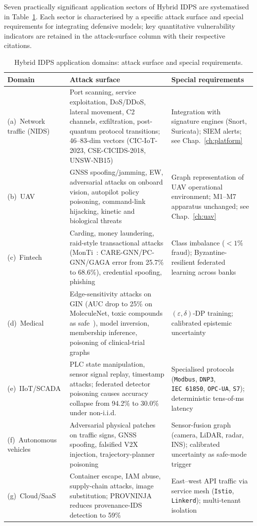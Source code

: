 Seven practically significant application sectors of Hybrid IDPS are systematised in Table~\ref{tab:idps_sectors}. Each sector is characterised by a specific attack surface and special requirements for integrating defensive models; key quantitative vulnerability indicators are retained in the attack-surface column with their respective citations.

\begin{table}[htbp]
\centering
\caption{Hybrid IDPS application domains: attack surface and special requirements.}
\label{tab:idps_sectors}
\small
\setlength{\tabcolsep}{4pt}
\begin{tabular}{p{2.8cm} p{6.5cm} p{5.0cm}}
\toprule
\textbf{Domain} & \textbf{Attack surface} & \textbf{Special requirements} \\
\midrule
(a)~Network traffic (NIDS) & Port scanning, service exploitation, DoS/DDoS, lateral movement, C2 channels, exfiltration, post-quantum protocol transitions; 46--83-dim vectors (CIC-IoT-2023, CSE-CICIDS-2018, UNSW-NB15) & Integration with signature engines (Snort, Suricata); SIEM alerts; see Chap.~\ref{ch:platform} \\
\addlinespace
(b)~UAV & GNSS spoofing/jamming, EW, adversarial attacks on onboard vision, autopilot policy poisoning, command-link hijacking, kinetic and biological threats & Graph representation of UAV operational environment; M1--M7 apparatus unchanged; see Chap.~\ref{ch:uav} \\
\addlinespace
(c)~Fintech & Carding, money laundering, raid-style transactional attacks (MonTi~\cite{MonTi2025}: CARE-GNN/PC-GNN/GAGA error from 25.7\% to 68.6\%), credential spoofing, phishing & Class imbalance ($<\!1\%$ fraud); Byzantine-resilient federated learning across banks \\
\addlinespace
(d)~Medical & Edge-sensitivity attacks on GIN (AUC drop to 25\% on MoleculeNet, toxic compounds as safe~\cite{EdgeSensitivity2025}), model inversion, membership inference, poisoning of clinical-trial graphs & $(\varepsilon,\delta)$-DP training; calibrated epistemic uncertainty \\
\addlinespace
(e)~IIoT/SCADA & PLC state manipulation, sensor signal replay, timestamp attacks; federated detector poisoning causes accuracy collapse from 94.2\% to 30.0\% under non-i.i.d.~\cite{FerragPoisoning2023} & Specialised protocols (\texttt{Modbus}, \texttt{DNP3}, \texttt{IEC~61850}, \texttt{OPC-UA}, \texttt{S7}); deterministic tens-of-ms latency \\
\addlinespace
(f)~Autonomous vehicles & Adversarial physical patches on traffic signs, GNSS spoofing, falsified V2X injection, trajectory-planner poisoning & Sensor-fusion graph (camera, LiDAR, radar, INS); calibrated uncertainty as safe-mode trigger \\
\addlinespace
(g)~Cloud/SaaS & Container escape, IAM abuse, supply-chain attacks, image substitution; PROVNINJA~\cite{PROVNINJA2023} reduces provenance-IDS detection to 59\% & East--west API traffic via service mesh (\texttt{Istio}, \texttt{Linkerd}); multi-tenant isolation \\
\bottomrule
\end{tabular}
\end{table}


